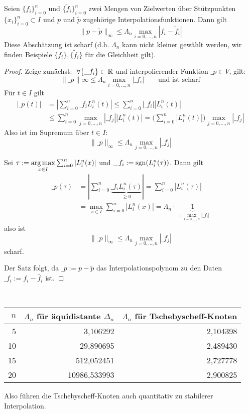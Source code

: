 \documentclass[
]{mycourse}
\begin{document}
\begin{st}
	\label{1.18}
	Seien $\{f_i\}_{i=0}^n$ und $\{\tilde f_i\}_{i=0}^n$ zwei Mengen von Zielwerten über Stützpunkten $\{x_i\}_{i=0}^n\subset I$ und $p$ und $\tilde p$ zugehörige Interpolationsfunktionen.
	Dann gilt
	\[
		\|p-\tilde p\|_\infty \le \Lambda_n \max_{i=0,\dotsc,n}|f_i-\tilde f_i|
	\]
	Diese Abschätzung ist scharf (d.h. $\Lambda_n$ kann nicht kleiner gewählt werden, wir finden Beispiele $\{f_i\},\{\tilde f_i\}$ für die Gleichheit gilt).
	\begin{proof}
		Zeige zunächst: $\forall \{\_{f_i}\}\subset \R$ und interpolierender Funktion $\_p\in V$, gilt:
		\[
			\|\_p\|\infty \le \Lambda_n \max_{i=0,\dotsc,n}|\_{f_i}| \qquad \text{und ist scharf}
		\]
		Für $t\in I$ gilt
		\begin{align*}
			|\_p(t)| &= \left| \sum_{i=0}^n \_{f_i} L_i^n(t)\right| 
			\le \sum_{i=0}^n |\_{f_i}||L_i^n(t)|\\
			&\le \sum_{i=0}^n \max_{j=0,\dotsc,n}|\_{f_j}||L_i^n(t)|
			= \bigg(\sum_{i=0}^n|L_i^n(t)| \bigg)\max_{j=0,\dotsc,n} |\_{f_j}|
		\end{align*}
		Also ist im Supremum über $t \in I$:
		\[
			\|\_p\|_\infty \le \Lambda_n \max_{j=0,\dotsc,n}|\_{f_j}|
		\]

		Sei $\tau := \argmax\limits_{x\in I} \sum_{i=0}^n|L_i^n(x)|$ und $\_{f_i} := \operatorname{sgn}(L_i^n(\tau))$.
		Dann gilt
		\begin{align*}
			\_p(\tau) &= \left| \sum_{i=0}^n \underbrace{\_{f_i}L_i^n(\tau)}_{\ge 0}\right| 
			= \sum_{i=0}^n |L_i^n(\tau)| \\
			&= \max_{x\in I} \sum_{i=0}^n |L_i^n(x)| 
			= \Lambda_n \cdot \underbrace{1}_{=\max\limits_{i=0,\dotsc,n}|\_{f_i}|}
		\end{align*}
		also ist 
		\[
			\|\_p\|_\infty \le \Lambda_n \max_{j=0,\dotsc,n}|\_{f_j}|
		\]
		scharf.

		Der Satz folgt, da $\_p := p-\tilde p$ das Interpolationspolynom zu den Daten $\_{f_i} := f_i - \tilde {f_i}$ ist.
	\end{proof}
\end{st}

\begin{ex*}~

	\begin{table}[H]
		\centering
		\begin{tabular}{r|r|r}
			$n$ & $\Lambda_n$ für äquidistante $\Delta_n$ & $\Lambda_n$ für Tschebyscheff-Knoten \\ \hline
			5 & 3,106292 & 2,104398 \\
			10 & 29,890695 & 2,489430 \\
			15 & 512,052451 & 2,727778 \\
			20 & 10986,533993 & 2,900825
		\end{tabular}
	\end{table}		
	Also führen die Tschebyscheff-Knoten auch quantitativ zu stabilerer Interpolation.
\end{ex*}
\end{document}
